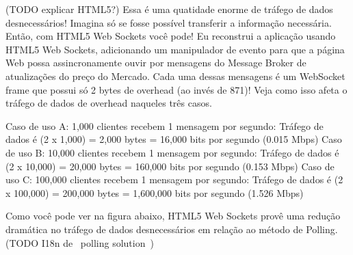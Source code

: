 \documentclass[a4paper,12pt]{article}
\begin{document}
(TODO explicar HTML5?)
Essa é uma quatidade enorme de tráfego de dados desnecessários! Imagina só se fosse possível transferir a informação necessária. Então, com HTML5 Web Sockets você pode! Eu reconstrui a aplicação usando HTML5 Web Sockets, adicionando um manipulador de evento para que a página Web possa assincronamente ouvir por mensagens do Message Broker de atualizações do preço do Mercado. Cada uma dessas mensagens é um WebSocket frame que possui só 2 bytes de overhead (ao invés de 871)! Veja como isso afeta o tráfego de dados de overhead naqueles três casos.


Caso de uso A: 1,000 clientes recebem 1 mensagem por segundo: Tráfego de dados é (2 x 1,000) = 2,000 bytes = 16,000 bits por segundo (0.015 Mbps)
Caso de uso B: 10,000 clientes recebem 1 mensagem por segundo: Tráfego de dados é (2 x 10,000) = 20,000 bytes = 160,000 bits por segundo (0.153 Mbps)
Caso de uso C: 100,000 clientes recebem 1 mensagem por segundo: Tráfego de dados é (2 x 100,000) = 200,000 bytes = 1,600,000 bits por segundo (1.526 Mbps)

Como você pode ver na figura abaixo, HTML5 Web Sockets provê uma redução dramática no tráfego de dados desnecessários em relação ao método de Polling.
(TODO I18n de ~polling solution~)
\end{document}
